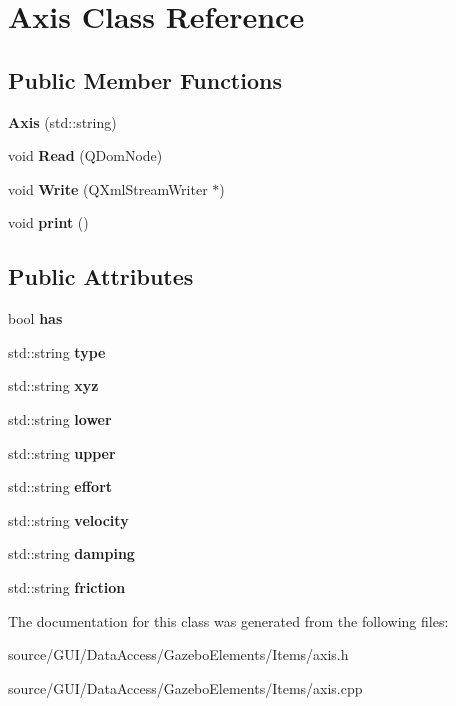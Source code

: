 \section{Axis Class Reference}
\label{class_axis}
\subsection*{Public Member Functions}
\begin{DoxyCompactItemize}
\item 
{\bfseries Axis} (std\+::string)\label{class_axis_acf240c35811e709d8d142d02b337f7a4}

\item 
void {\bfseries Read} (Q\+Dom\+Node)\label{class_axis_a332e7619952354a52974158215a70374}

\item 
void {\bfseries Write} (Q\+Xml\+Stream\+Writer $\ast$)\label{class_axis_a064e54f853a161a398efdfbed58ade68}

\item 
void {\bfseries print} ()\label{class_axis_ac5afb001e5b2a1c973cf9099c0c80595}

\end{DoxyCompactItemize}
\subsection*{Public Attributes}
\begin{DoxyCompactItemize}
\item 
bool {\bfseries has}\label{class_axis_a4f0adaca54350bf17ea5431846043314}

\item 
std\+::string {\bfseries type}\label{class_axis_aa6e3a54522bba2587dca4aabd636ed6f}

\item 
std\+::string {\bfseries xyz}\label{class_axis_a7e94cb3d339f03236054c754f4e67f74}

\item 
std\+::string {\bfseries lower}\label{class_axis_ad4a2d0b0bf25f00e924fbc78cffd8399}

\item 
std\+::string {\bfseries upper}\label{class_axis_a18e0a9daf87aa6eedd6da98ec30bf45a}

\item 
std\+::string {\bfseries effort}\label{class_axis_a4899e03e026be2a441710e222c37e8e4}

\item 
std\+::string {\bfseries velocity}\label{class_axis_a551d7197e5d8b9698e6abe2f3d5025a7}

\item 
std\+::string {\bfseries damping}\label{class_axis_a8a1fe2a2f2f122a2acad685c9e440142}

\item 
std\+::string {\bfseries friction}\label{class_axis_a868f50edfd467ea29267bcb86ad13823}

\end{DoxyCompactItemize}


The documentation for this class was generated from the following files\+:\begin{DoxyCompactItemize}
\item 
source/\+G\+U\+I/\+Data\+Access/\+Gazebo\+Elements/\+Items/axis.\+h\item 
source/\+G\+U\+I/\+Data\+Access/\+Gazebo\+Elements/\+Items/axis.\+cpp\end{DoxyCompactItemize}
